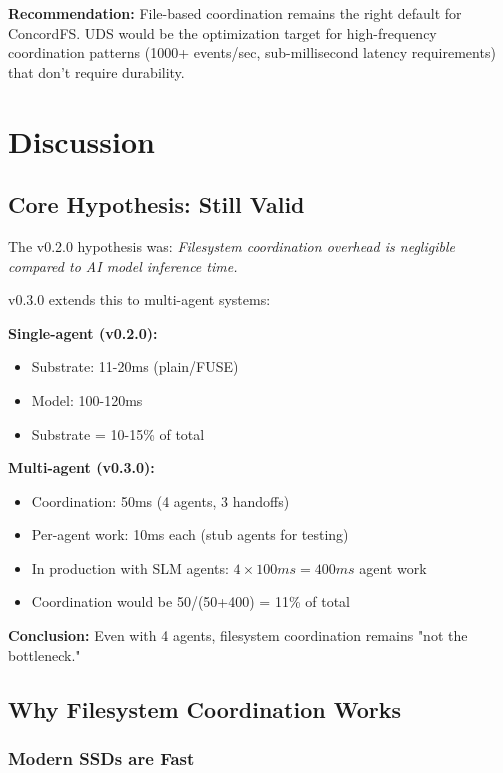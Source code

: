 \documentclass[11pt]{article}
\begin{document}
\textbf{Recommendation:} File-based coordination remains the right default for ConcordFS. UDS would be the optimization target for high-frequency coordination patterns (1000+ events/sec, sub-millisecond latency requirements) that don't require durability.

\section{Discussion}

\subsection{Core Hypothesis: Still Valid}

The v0.2.0 hypothesis was: \textit{Filesystem coordination overhead is negligible compared to AI model inference time.}

v0.3.0 extends this to multi-agent systems:

\textbf{Single-agent (v0.2.0):}
\begin{itemize}
\item Substrate: 11-20ms (plain/FUSE)
\item Model: 100-120ms
\item Substrate = 10-15\% of total
\end{itemize}

\textbf{Multi-agent (v0.3.0):}
\begin{itemize}
\item Coordination: 50ms (4 agents, 3 handoffs)
\item Per-agent work: 10ms each (stub agents for testing)
\item In production with SLM agents: $4 \times 100ms = 400ms$ agent work
\item Coordination would be 50/(50+400) = 11\% of total
\end{itemize}

\textbf{Conclusion:} Even with 4 agents, filesystem coordination remains "not the bottleneck."

\subsection{Why Filesystem Coordination Works}

\subsubsection{Modern SSDs are Fast}
\end{document}
